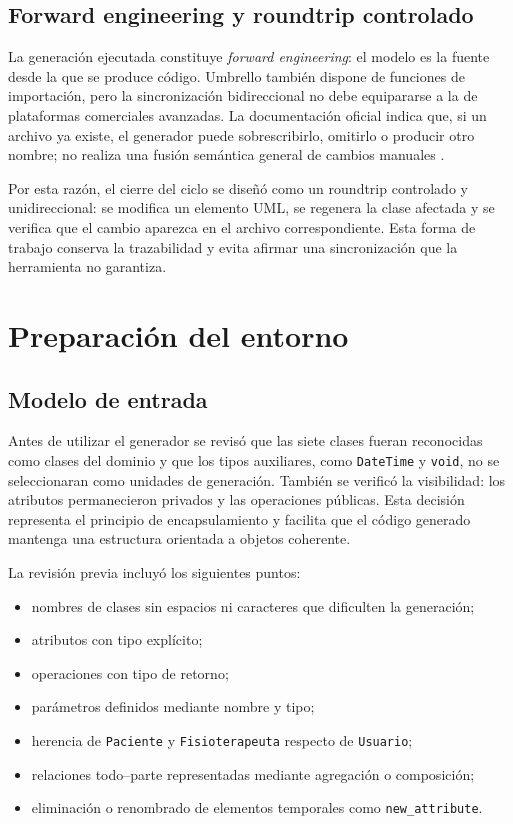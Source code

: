 \subsection{Forward engineering y roundtrip controlado}
La generación ejecutada constituye \textit{forward engineering}: el modelo es la fuente desde la que se produce código. Umbrello también dispone de funciones de importación, pero la sincronización bidireccional no debe equipararse a la de plataformas comerciales avanzadas. La documentación oficial indica que, si un archivo ya existe, el generador puede sobrescribirlo, omitirlo o producir otro nombre; no realiza una fusión semántica general de cambios manuales \cite{KDEUmbrelloCodegen,KDEUmbrelloSettings}.

Por esta razón, el cierre del ciclo se diseñó como un roundtrip controlado y unidireccional: se modifica un elemento UML, se regenera la clase afectada y se verifica que el cambio aparezca en el archivo correspondiente. Esta forma de trabajo conserva la trazabilidad y evita afirmar una sincronización que la herramienta no garantiza.

\section{Preparación del entorno}
\subsection{Modelo de entrada}
Antes de utilizar el generador se revisó que las siete clases fueran reconocidas como clases del dominio y que los tipos auxiliares, como \texttt{DateTime} y \texttt{void}, no se seleccionaran como unidades de generación. También se verificó la visibilidad: los atributos permanecieron privados y las operaciones públicas. Esta decisión representa el principio de encapsulamiento y facilita que el código generado mantenga una estructura orientada a objetos coherente.

La revisión previa incluyó los siguientes puntos:
\begin{itemize}
  \item nombres de clases sin espacios ni caracteres que dificulten la generación;
  \item atributos con tipo explícito;
  \item operaciones con tipo de retorno;
  \item parámetros definidos mediante nombre y tipo;
  \item herencia de \texttt{Paciente} y \texttt{Fisioterapeuta} respecto de \texttt{Usuario};
  \item relaciones todo--parte representadas mediante agregación o composición;
  \item eliminación o renombrado de elementos temporales como \texttt{new\_attribute}.
\end{itemize}

